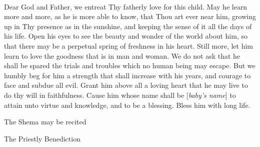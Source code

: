 \documentclass[14pt, article, extrafontsizes, twopage, a4paper]{memoir}
\begin{document}
{\\
Dear God and Father,
we entreat Thy fatherly love for this child.
May he learn more and more,
as he is more able to know,
that Thou art ever near him,
growing up in Thy presence as in the sunshine,
and keeping the sense of it all the days of his life.
Open his eyes to see the beauty and wonder of the world about him,
so that there may be a perpetual spring of freshness in his heart.
Still more,
let him learn to love the goodness that is in man and woman.
We do not ask that he shall be spared the trials and troubles
which no human being may escape.
But we humbly beg for him a strength that shall increase with his years,
and courage to face and subdue all evil.
Grant him above all a loving heart that he may live to do thy will in faithfulness.
Cause him whose name shall be [\textsl{baby’s name}]
to attain unto virtue and knowledge,
and to be a blessing.
Bless him with long life.

{\centering\larger[2]
  The Shema may be recited

  The Priestly Benediction

}

}
\end{document}
